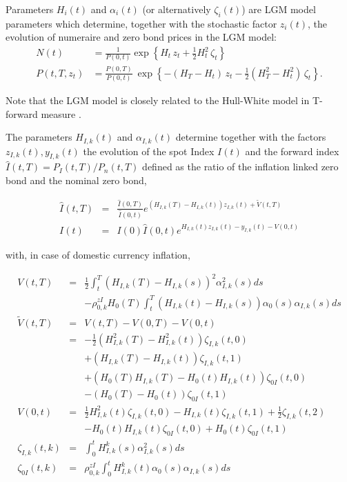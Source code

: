 \medskip Parameters $H_i(t)$ and $\alpha_i(t)$ (or alternatively $\zeta_i(t)$) are LGM model parameters which determine,
together with the stochastic factor $z_i(t)$, the evolution of numeraire and zero bond prices in the LGM model:
\begin{align}
N(t) &= \frac{1}{P(0,t)}\exp\left\{H_t\, z_t + \frac{1}{2}H^2_t\,\zeta_t \right\}
\label{lgm1f_numeraire} \\
P(t,T,z_t)
&= \frac{P(0,T)}{P(0,t)}\:\exp\left\{ -(H_T-H_t)\,z_t - \frac{1}{2} \left(H^2_T-H^2_t\right)\,\zeta_t\right\}.
\label{lgm1f_zerobond}
\end{align}

Note that the LGM model is closely related to the Hull-White model in T-forward measure \cite{Lichters}.

\medskip The parameters $H_{I,k}(t)$ and $\alpha_{I,k}(t)$ determine together with the factors $z_{I,k}(t), y_{I,k}(t)$
the evolution of the spot Index $I(t)$ and the forward index $\hat{I}(t,T) = P_I(t,T) / P_n(t,T)$ defined as the ratio
of the inflation linked zero bond and the nominal zero bond,

\begin{eqnarray*}
  \hat{I}(t,T) &=& \frac{\hat{I}(0,T)}{\hat{I}(0,t)} e^{(H_{I,k}(T)-H_{I,k}(t))z_{I,k}(t)+\tilde{V}(t,T)} \\
  I(t) &=& I(0) \hat{I}(0,t)e^{H_{I,k}(t)z_{I,k}(t)-y_{I,k}(t)-V(0,t)}
\end{eqnarray*}

with, in case of domestic currency inflation,

\begin{eqnarray*}
  V(t,T) &=& \frac{1}{2} \int_t^T (H_{I,k}(T)-H_{I,k}(s))^2 \alpha_{I,k}^2(s) ds \\
         & & - \rho^{zI}_{0,k} H_0(T) \int_t^T (H_{I,k}(t)-H_{I,k}(s))\alpha_0(s)\alpha_{I,k}(s)ds \\
  \tilde{V}(t,T) &=& V(t,T) - V(0,T) -V(0,t) \\
         &=& -\frac{1}{2}(H_{I,k}^2(T)-H_{I,k}^2(t))\zeta_{I,k}(t,0) \\
         & & +(H_{I,k}(T)-H_{I,k}(t)) \zeta_{I,k}(t,1) \\
         & & +(H_0(T)H_{I,k}(T) - H_0(t)H_{I,k}(t))\zeta_{0I}(t,0) \\
         & & -(H_0(T)-H_0(t))\zeta_{0I}(t,1) \\
  V(0,t) &=& \frac{1}{2}H_{I,k}^2(t)\zeta_{I,k}(t,0)-H_{I,k}(t)\zeta_{I,k}(t,1)+\frac{1}{2}\zeta_{I,k}(t,2) \\
         & & -H_0(t)H_{I,k}(t)\zeta_{0I}(t,0)+H_0(t)\zeta_{0I}(t,1) \\
  \zeta_{I,k}(t,k) &=& \int_0^t H_{I,k}^k(s)\alpha_{I,k}^2(s) ds \\
  \zeta_{0I}(t,k) &=& \rho^{zI}_{0,k}\int_0^t H_{I,k}^k(t) \alpha_0(s) \alpha_{I,k}(s) ds
\end{eqnarray*}

